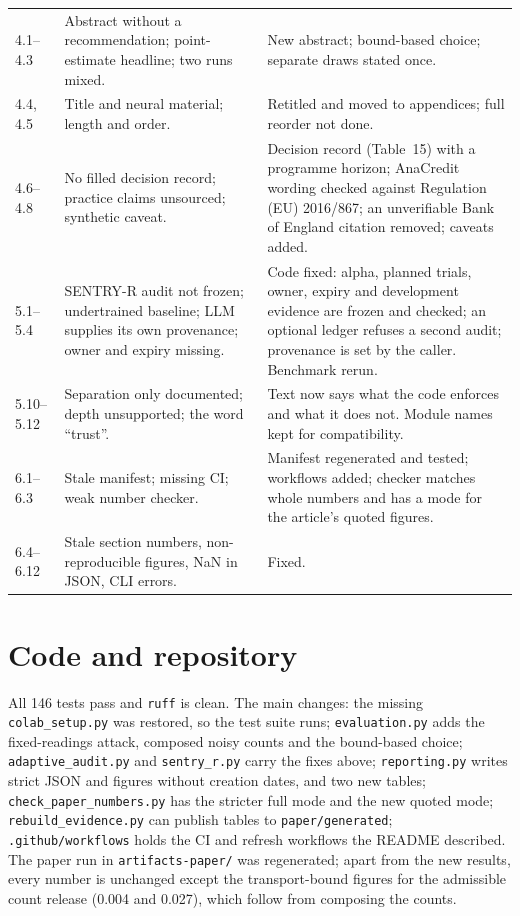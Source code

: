 \documentclass[11pt,a4paper]{article}
\begin{document}
\begin{longtable}{@{}p{0.9cm}p{7.8cm}p{6.4cm}@{}}
4.1--4.3 & Abstract without a recommendation; point-estimate headline; two runs mixed. &
New abstract; bound-based choice; separate draws stated once.\\
4.4, 4.5 & Title and neural material; length and order. & Retitled and moved to
appendices; full reorder not done.\\
4.6--4.8 & No filled decision record; practice claims unsourced; synthetic caveat. &
Decision record (Table~15) with a programme horizon; AnaCredit wording checked against
Regulation (EU) 2016/867; an unverifiable Bank of England citation removed; caveats
added.\\
5.1--5.4 & SENTRY-R audit not frozen; undertrained baseline; LLM supplies its own
provenance; owner and expiry missing. & Code fixed: alpha, planned trials, owner, expiry
and development evidence are frozen and checked; an optional ledger refuses a second
audit; provenance is set by the caller. Benchmark rerun.\\
5.10--5.12 & Separation only documented; depth unsupported; the word ``trust''. & Text now
says what the code enforces and what it does not. Module names kept for compatibility.\\
6.1--6.3 & Stale manifest; missing CI; weak number checker. & Manifest regenerated and
tested; workflows added; checker matches whole numbers and has a mode for the article's
quoted figures.\\
6.4--6.12 & Stale section numbers, non-reproducible figures, NaN in JSON, CLI errors. &
Fixed.\\
\bottomrule
\end{longtable}

\section*{Code and repository}
All 146 tests pass and \texttt{ruff} is clean. The main changes: the missing
\texttt{colab\_setup.py} was restored, so the test suite runs; \texttt{evaluation.py}
adds the fixed-readings attack, composed noisy counts and the bound-based choice;
\texttt{adaptive\_audit.py} and \texttt{sentry\_r.py} carry the fixes above;
\texttt{reporting.py} writes strict JSON and figures without creation dates, and two new
tables; \texttt{check\_paper\_numbers.py} has the stricter full mode and the new quoted
mode; \texttt{rebuild\_evidence.py} can publish tables to \texttt{paper/generated};
\texttt{.github/workflows} holds the CI and refresh workflows the README described. The
paper run in \texttt{artifacts-paper/} was regenerated; apart from the new results, every
number is unchanged except the transport-bound figures for the admissible count release
(0.004 and 0.027), which follow from composing the counts.
\end{document}
